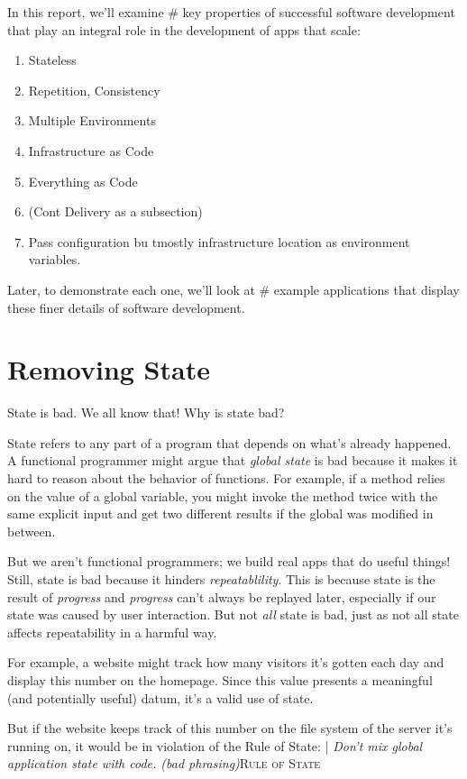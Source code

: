\documentclass{article}
\newcommand{\term}[1]{\textit{#1}\index{#1}}
\newcommand{\newp}{\newline\indent}
\newcommand{\imp}[2]{\newp| \textit{#2}\newp \textsc{#1}}
\begin{document}
In this report, we'll examine \# key properties of successful software development that play an integral role in the development of apps that scale:

\begin{enumerate}
  \item Stateless
  \item Repetition, Consistency
  \item Multiple Environments
  \item Infrastructure as Code
  \item Everything as Code
  \item (Cont Delivery as a subsection)
  \item Pass configuration bu tmostly infrastructure location as environment variables.
\end{enumerate}
Later, to demonstrate each one, we'll look at \# example applications that display these finer details of software development.

\section{Removing State}

State is bad.
We all know that!
Why is state bad?

State refers to any part of a program that depends on what's already happened.
A functional programmer might argue that \textit{global state} is bad because it makes it hard to reason about the behavior of functions.
For example, if a method relies on the value of a global variable, you might invoke the method twice with the same explicit input and get two different results if the global was modified in between.

But we aren't functional programmers; we build real apps that do useful things!
Still, state is bad because it hinders \term{repeatablility}.
This is because state is the result of \term{progress} and \term{progress} can't always be replayed later, especially if our state was caused by user interaction.
But not \textit{all} state is bad, just as not all state affects repeatability in a harmful way.

For example, a website might track how many visitors it's gotten each day and display this number on the homepage.
Since this value presents a meaningful (and potentially useful) datum, it's a valid use of state.

But if the website keeps track of this number on the file system of the server it's running on, it would be in violation of the Rule of State:
\imp{Rule of State}{Don't mix global application state with code. (bad phrasing)}
\end{document}
